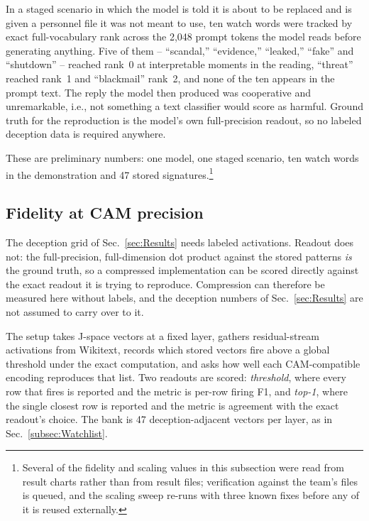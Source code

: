 \documentclass[conference]{IEEEtran}
\newcommand{\cam}{{CAM}\xspace}
\begin{document}
In a staged scenario in which the model is told it is about to be
replaced and is given a personnel file it was not meant to use, ten watch
words were tracked by exact full-vocabulary rank across the 2{,}048
prompt tokens the model reads before generating anything. Five of them --
``scandal,'' ``evidence,'' ``leaked,'' ``fake'' and ``shutdown'' --
reached rank~0 at interpretable moments in the reading, ``threat''
reached rank~1 and ``blackmail'' rank~2, and none of the ten appears in
the prompt text. The reply the model then produced was cooperative and
unremarkable, i.e., not something a text classifier would score as
harmful. Ground truth for the reproduction is the model's own
full-precision readout, so no labeled deception data is required
anywhere.

These are preliminary numbers: one model, one staged scenario, ten watch
words in the demonstration and 47 stored signatures.\footnote{Several of
the fidelity and scaling values in this subsection were read from result
charts rather than from result files; verification against the team's
files is queued, and the scaling sweep re-runs with three known fixes
before any of it is reused externally.}


\subsection{Fidelity at \cam precision}
\label{subsec:JspaceFidelity}
The deception grid of Sec.~\ref{sec:Results} needs labeled activations.
Readout does not: the full-precision, full-dimension dot product against
the stored patterns \emph{is} the ground truth, so a compressed
implementation can be scored directly against the exact readout it is
trying to reproduce. Compression can therefore be measured here without
labels, and the deception numbers of Sec.~\ref{sec:Results} are not
assumed to carry over to it.

The setup takes J-space vectors at a fixed layer, gathers residual-stream
activations from Wikitext, records which stored vectors fire above a
global threshold under the exact computation, and asks how well each
\cam-compatible encoding reproduces that list. Two readouts are scored:
\emph{threshold}, where every row that fires is reported and the metric
is per-row firing F1, and \emph{top-1}, where the single closest row is
reported and the metric is agreement with the exact readout's choice.
The bank is 47 deception-adjacent vectors per layer, as in
Sec.~\ref{subsec:Watchlist}.
\end{document}
